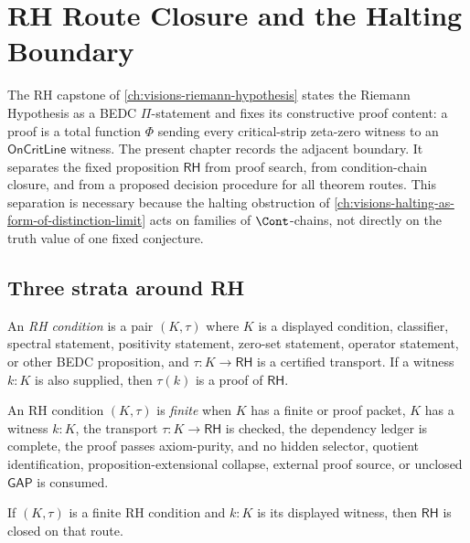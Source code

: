 \chapter{RH Route Closure and the Halting Boundary}
\label{ch:visions-rh-route-halting-boundary}

The RH capstone of \autoref{ch:visions-riemann-hypothesis} states the
Riemann Hypothesis as a BEDC $\Pi$-statement and fixes its constructive
proof content: a proof is a total function $\Phi$ sending every
critical-strip zeta-zero witness to an $\mathsf{OnCritLine}$ witness.  The
present chapter records the adjacent boundary.  It separates the fixed
proposition $\mathsf{RH}$ from proof search, from condition-chain closure,
and from a proposed decision procedure for all theorem routes.  This
separation is necessary because the halting obstruction of
\autoref{ch:visions-halting-as-form-of-distinction-limit} acts on families
of $\Cont$-chains, not directly on the truth value of one fixed conjecture.

\section{Three strata around RH}
\label{sec:rh-route-three-strata}

\begin{definition}[RH condition]
\label{def:rh-condition}
An \emph{RH condition} is a pair $(K,\tau)$ where $K$ is a displayed
condition, classifier, spectral statement, positivity statement, zero-set
statement, operator statement, or other BEDC proposition, and
$\tau : K \to \mathsf{RH}$ is a certified transport.  If a witness
$k:K$ is also supplied, then $\tau(k)$ is a proof of $\mathsf{RH}$.
\end{definition}

\begin{definition}
\label{def:finite-rh-condition}
An RH condition $(K,\tau)$ is \emph{finite} when $K$ has a finite
\NameCert{} or proof packet, $K$ has a witness $k:K$, the transport
$\tau : K \to \mathsf{RH}$ is checked, the dependency ledger is complete,
the proof passes axiom-purity, and no hidden selector, quotient
identification, proposition-extensional collapse, external proof source, or
unclosed $\mathsf{GAP}$ is consumed.
\end{definition}

\begin{theorem}
\label{thm:finite-rh-condition-closes-rh}
If $(K,\tau)$ is a finite RH condition and $k:K$ is its displayed witness,
then $\mathsf{RH}$ is closed on that route.
\end{theorem}

